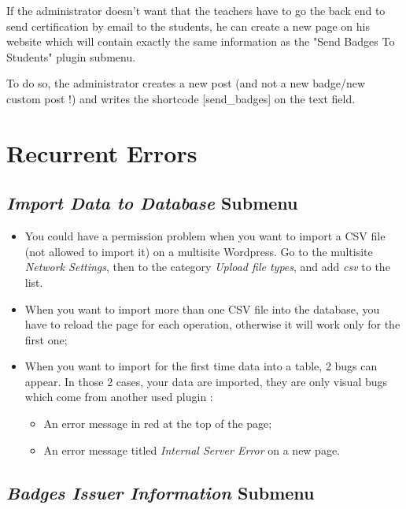 \documentclass[a4paper, 12pt]{report}
\begin{document}
		If the administrator doesn't want that the teachers have to go the back end to send certification by email to the students, he can create a new page on his website which will contain exactly the same information as the "Send Badges To Students" plugin submenu.
		
		To do so, the administrator creates a new post (and not a new badge/new custom post !) and writes the shortcode [send\_badges] on the text field.
		
		



	\chapter{Recurrent Errors}
	
		\section{\textit{Import Data to Database} Submenu}
		
		\begin{itemize}
		
			\item You could have a permission problem when you want to import a CSV file (not allowed to import it) on a multisite Wordpress. Go to the multisite \textit{Network Settings}, then to the category \textit{Upload file types}, and add \textit{csv} to the list.

			\item When you want to import more than one CSV file into the database, you have to reload the page for each operation, otherwise it will work only for the first one;
			
			\item When you want to import for the first time data into a table, 2 bugs can appear. In those 2 cases, your data are imported, they are only visual bugs which come from another used plugin :
	 		\begin{itemize}
				\item An error message in red at the top of the page;
				\item An error message titled \textit{Internal Server Error} on a new page.
			\end{itemize}
			
		\end{itemize}
	

		\section{\textit{Badges Issuer Information} Submenu}
		
\end{document}
